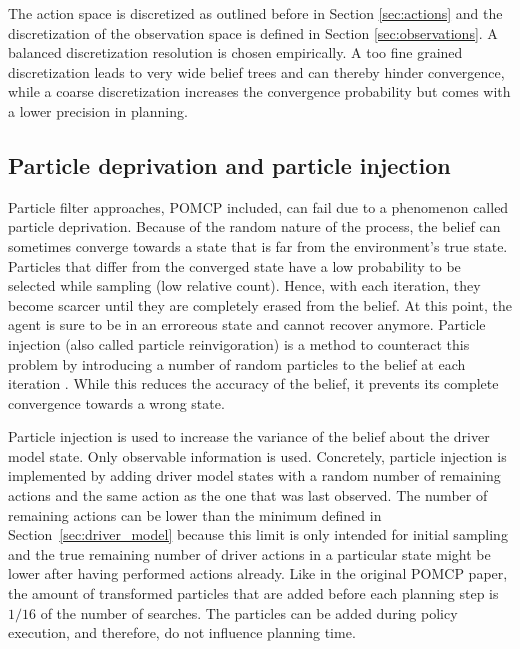 The action space is discretized as outlined before in Section \ref{sec:actions} and the discretization of the observation space is defined in Section \ref{sec:observations}. A balanced discretization resolution is chosen empirically. A too fine grained discretization leads to very wide belief trees and can thereby hinder convergence, while a coarse discretization increases the convergence probability but comes with a lower precision in planning.



\subsection{Particle deprivation and particle injection}
\label{sec:particle_deprivation}

Particle filter approaches, POMCP included, can fail due to a phenomenon called particle deprivation. Because of the random nature of the process, the belief can sometimes converge towards a state that is far from the environment's true state. Particles that differ from the converged state have a low probability to be selected while sampling (low relative count). Hence, with each iteration, they become scarcer until they are completely erased from the belief. At this point, the agent is sure to be in an erroreous state and cannot recover anymore. Particle injection (also called particle reinvigoration) is a method to counteract this problem by introducing a number of random particles to the belief at each iteration \parencite{decision_making_book}. While this reduces the accuracy of the belief, it prevents its complete convergence towards a wrong state. 

Particle injection is used to increase the variance of the belief about the driver model state. Only observable information is used. Concretely, particle injection is implemented by adding driver model states with a random number of remaining actions and the same action as the one that was last observed. The number of remaining actions can be lower than the minimum defined in Section~\ref{sec:driver_model} because this limit is only intended for initial sampling and the true remaining number of driver actions in a particular state might be lower after having performed actions already. Like in the original POMCP paper, the amount of transformed particles that are added before each planning step is $1/16$ of the number of searches. The particles can be added during policy execution, and therefore, do not influence planning time.

